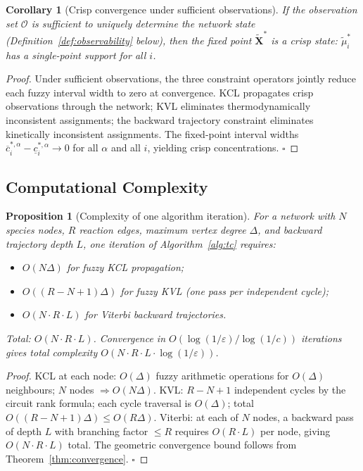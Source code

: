 \documentclass[twocolumn,10pt,a4paper]{article}
\newtheorem{proposition}[theorem]{Proposition}
\newtheorem{corollary}[theorem]{Corollary}
\begin{document}
\begin{corollary}[Crisp convergence under sufficient observations]
\label{cor:crisp}
If the observation set $\mathcal{O}$ is sufficient to uniquely determine the
network state (Definition~\ref{def:observability} below), then the fixed point
$\widetilde{\mathbf{X}}^*$ is a crisp state: $\tilde{\mu}_i^*$ has a
single-point support for all $i$.
\end{corollary}

\begin{proof}
Under sufficient observations, the three constraint operators jointly reduce
each fuzzy interval width to zero at convergence.  KCL propagates crisp
observations through the network; KVL eliminates thermodynamically inconsistent
assignments; the backward trajectory constraint eliminates kinetically
inconsistent assignments.  The fixed-point interval widths
$\overline{c}_i^{*,\alpha}-\underline{c}_i^{*,\alpha}\to 0$ for all $\alpha$
and all $i$, yielding crisp concentrations.  $\square$
\end{proof}

\subsection{Computational Complexity}
\label{sec:alg-complexity}

\begin{proposition}[Complexity of one algorithm iteration]
\label{prop:complexity}
For a network with $N$ species nodes, $R$ reaction edges, maximum vertex
degree $\Delta$, and backward trajectory depth $L$, one iteration of
Algorithm~\ref{alg:tc} requires:
\begin{itemize}[noitemsep]
  \item $O(N\Delta)$ for fuzzy KCL propagation;
  \item $O((R-N+1)\Delta)$ for fuzzy KVL (one pass per independent cycle);
  \item $O(N\cdot R\cdot L)$ for Viterbi backward trajectories.
\end{itemize}
Total: $O(N\cdot R\cdot L)$.  Convergence in $O(\log(1/\varepsilon)/\log(1/c))$
iterations gives total complexity $O(N\cdot R\cdot L\cdot\log(1/\varepsilon))$.
\end{proposition}

\begin{proof}
KCL at each node: $O(\Delta)$ fuzzy arithmetic operations for $O(\Delta)$
neighbours; $N$ nodes $\Rightarrow O(N\Delta)$.  KVL: $R-N+1$ independent
cycles by the circuit rank formula; each cycle traversal is $O(\Delta)$;
total $O((R-N+1)\Delta)\leq O(R\Delta)$.  Viterbi: at each of $N$ nodes, a
backward pass of depth $L$ with branching factor $\leq R$ requires $O(R\cdot L)$
per node, giving $O(N\cdot R\cdot L)$ total.  The geometric convergence bound
follows from Theorem~\ref{thm:convergence}.  $\square$
\end{proof}
\end{document}
